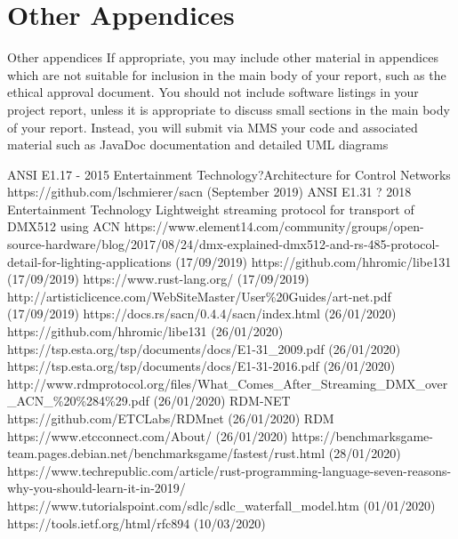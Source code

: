 \documentclass[11pt,a4paper]{report}
\begin{document}
\section{Other Appendices}
Other
appendices
If appropriate, you may include other material in
appendices which are not suitable for inclusion in the
main body of your report, such as the ethical approval
document.
You should not include software listings in your project report, unless it is
appropriate to discuss small sections in the main body of your report. Instead,
you will submit via MMS your code and associated material such as JavaDoc
documentation and detailed UML diagrams

\begin{thebibliography}{9}
	ANSI E1.17 - 2015 Entertainment Technology?Architecture for Control Networks
	https://github.com/lschmierer/sacn (September 2019)
	ANSI E1.31 ? 2018 Entertainment Technology Lightweight streaming protocol for transport of DMX512 using ACN
	https://www.element14.com/community/groups/open-source-hardware/blog/2017/08/24/dmx-explained-dmx512-and-rs-485-protocol-detail-for-lighting-applications (17/09/2019)
	https://github.com/hhromic/libe131 (17/09/2019)
	https://www.rust-lang.org/ (17/09/2019)
	http://artisticlicence.com/WebSiteMaster/User\%20Guides/art-net.pdf (17/09/2019)
	https://docs.rs/sacn/0.4.4/sacn/index.html
	(26/01/2020)
	https://github.com/hhromic/libe131
	(26/01/2020)
	https://tsp.esta.org/tsp/documents/docs/E1-31\_2009.pdf
	(26/01/2020)
	https://tsp.esta.org/tsp/documents/docs/E1-31-2016.pdf
	(26/01/2020)
	http://www.rdmprotocol.org/files/What\_Comes\_After\_Streaming\_DMX\_over\_ACN\_\%20\%284\%29.pdf (26/01/2020)
	RDM-NET
	https://github.com/ETCLabs/RDMnet (26/01/2020)
	RDM
	https://www.etcconnect.com/About/ (26/01/2020)
	https://benchmarksgame-team.pages.debian.net/benchmarksgame/fastest/rust.html (28/01/2020)
	https://www.techrepublic.com/article/rust-programming-language-seven-reasons-why-you-should-learn-it-in-2019/
	https://www.tutorialspoint.com/sdlc/sdlc\_waterfall\_model.htm (01/01/2020)
	https://tools.ietf.org/html/rfc894 (10/03/2020)

\end{thebibliography}
\end{document}
